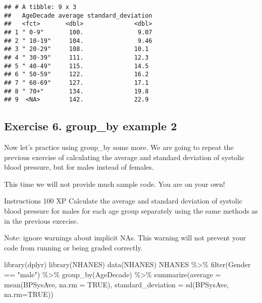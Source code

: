 \documentclass[
]{article}
\newenvironment{Shaded}{\begin{snugshade}}{\end{snugshade}}
\newcommand{\AttributeTok}[1]{\textcolor[rgb]{0.77,0.63,0.00}{#1}}
\newcommand{\ConstantTok}[1]{\textcolor[rgb]{0.00,0.00,0.00}{#1}}
\newcommand{\FunctionTok}[1]{\textcolor[rgb]{0.00,0.00,0.00}{#1}}
\newcommand{\NormalTok}[1]{#1}
\newcommand{\SpecialCharTok}[1]{\textcolor[rgb]{0.00,0.00,0.00}{#1}}
\newcommand{\StringTok}[1]{\textcolor[rgb]{0.31,0.60,0.02}{#1}}
\begin{document}
\begin{verbatim}
## # A tibble: 9 x 3
##   AgeDecade average standard_deviation
##   <fct>       <dbl>              <dbl>
## 1 " 0-9"       100.               9.07
## 2 " 10-19"     104.               9.46
## 3 " 20-29"     108.              10.1 
## 4 " 30-39"     111.              12.3 
## 5 " 40-49"     115.              14.5 
## 6 " 50-59"     122.              16.2 
## 7 " 60-69"     127.              17.1 
## 8 " 70+"       134.              19.8 
## 9  <NA>        142.              22.9
\end{verbatim}

\hypertarget{exercise-6.-group_by-example-2}{%
\subsection{Exercise 6. group\_by example
2}\label{exercise-6.-group_by-example-2}}

Now let's practice using group\_by some more. We are going to repeat the
previous exercise of calculating the average and standard deviation of
systolic blood pressure, but for males instead of females.

This time we will not provide much sample code. You are on your own!

Instructions 100 XP Calculate the average and standard deviation of
systolic blood pressure for males for each age group separately using
the same methods as in the previous exercise.

Note: ignore warnings about implicit NAs. This warning will not prevent
your code from running or being graded correctly.

\begin{Shaded}
\begin{Highlighting}[]
\FunctionTok{library}\NormalTok{(dplyr)}
\FunctionTok{library}\NormalTok{(NHANES)}
\FunctionTok{data}\NormalTok{(NHANES)}
\NormalTok{NHANES }\SpecialCharTok{\%\textgreater{}\%}
      \FunctionTok{filter}\NormalTok{(Gender }\SpecialCharTok{==} \StringTok{"male"}\NormalTok{) }\SpecialCharTok{\%\textgreater{}\%}
      \FunctionTok{group\_by}\NormalTok{(AgeDecade) }\SpecialCharTok{\%\textgreater{}\%}
      \FunctionTok{summarize}\NormalTok{(}\AttributeTok{average =} \FunctionTok{mean}\NormalTok{(BPSysAve, }\AttributeTok{na.rm =} \ConstantTok{TRUE}\NormalTok{), }
            \AttributeTok{standard\_deviation =} \FunctionTok{sd}\NormalTok{(BPSysAve, }\AttributeTok{na.rm=}\ConstantTok{TRUE}\NormalTok{))}
\end{Highlighting}
\end{Shaded}
\end{document}
